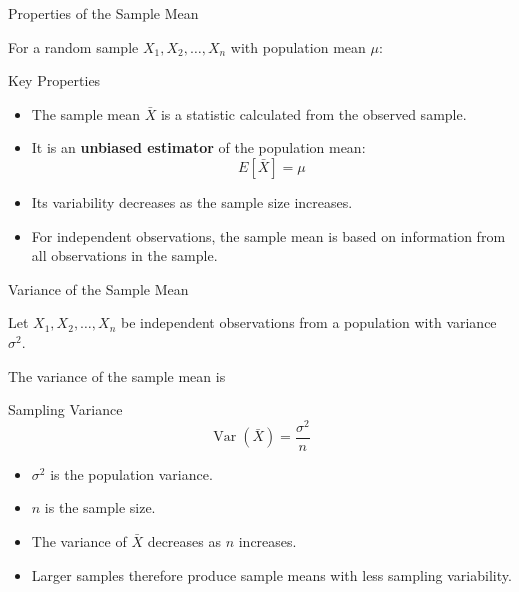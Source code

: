 \documentclass{beamer}
\begin{document}


\begin{frame}{Properties of the Sample Mean}

For a random sample $X_1,X_2,\ldots,X_n$ with population
mean $\mu$:

\begin{block}{Key Properties}
\begin{itemize}
    \item The sample mean $\bar{X}$ is a statistic calculated
          from the observed sample.
    \item It is an \textbf{unbiased estimator} of the population mean:
    \[
    E[\bar{X}] = \mu
    \]
    \item Its variability decreases as the sample size increases.
    \item For independent observations, the sample mean is based
          on information from all observations in the sample.
\end{itemize}
\end{block}

\end{frame}


\begin{frame}{Variance of the Sample Mean}

Let $X_1,X_2,\ldots,X_n$ be independent observations
from a population with variance $\sigma^2$.

The variance of the sample mean is

\begin{block}{Sampling Variance}
\[
\boxed{
\operatorname{Var}(\bar{X})
=
\frac{\sigma^2}{n}
}
\]
\end{block}

\begin{itemize}
    \item $\sigma^2$ is the population variance.
    \item $n$ is the sample size.
    \item The variance of $\bar{X}$ decreases as $n$ increases.
    \item Larger samples therefore produce sample means with
          less sampling variability.
\end{itemize}

\end{frame}
\end{document}
